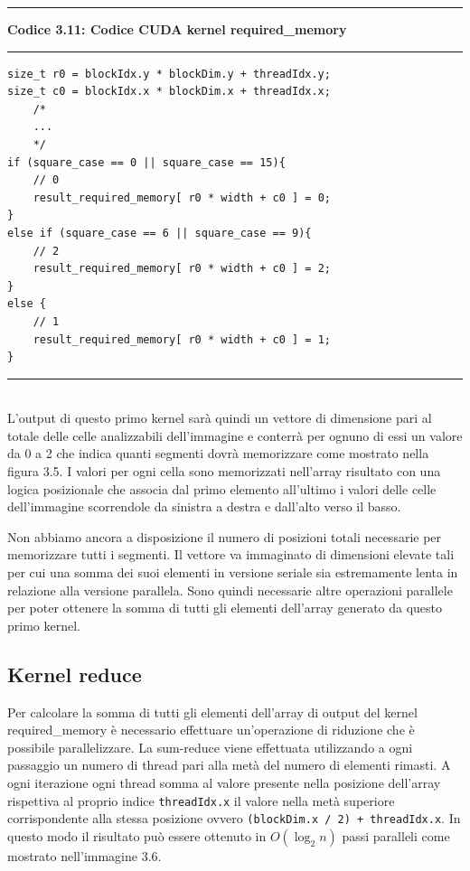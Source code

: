 \documentclass[12pt,a4paper]{report}
\begin{document}
\noindent\rule[0.5ex]{\linewidth}{2pt}
\small{\textbf{Codice 3.11: Codice CUDA kernel required\_memory}} \\
\noindent\rule[0.5ex]{\linewidth}{1pt}
\begin{lstlisting}
size_t r0 = blockIdx.y * blockDim.y + threadIdx.y;
size_t c0 = blockIdx.x * blockDim.x + threadIdx.x;
    /*
    ...
    */
if (square_case == 0 || square_case == 15){
    // 0
    result_required_memory[ r0 * width + c0 ] = 0;
}
else if (square_case == 6 || square_case == 9){
    // 2
    result_required_memory[ r0 * width + c0 ] = 2;
}
else {
    // 1
    result_required_memory[ r0 * width + c0 ] = 1;
}  
\end{lstlisting}
\noindent\rule[0.5ex]{\linewidth}{1pt} \\[10pt]
\newpage
L'output di questo primo kernel sarà quindi un vettore di dimensione pari al totale delle celle analizzabili dell'immagine e conterrà per ognuno di essi un valore da 0 a 2 che indica quanti segmenti dovrà memorizzare come mostrato nella figura 3.5. I valori per ogni cella sono memorizzati nell'array risultato con una logica posizionale che associa dal primo elemento all'ultimo i valori delle celle dell'immagine scorrendole da sinistra a destra e dall'alto verso il basso.
\begin{figure}[H]
\centering
\begin{floatrow}[1]
\end{floatrow}
\end{figure} 
Non abbiamo ancora a disposizione il numero di posizioni totali necessarie per memorizzare tutti i segmenti. Il vettore va immaginato di dimensioni elevate tali per cui una somma dei suoi elementi in versione seriale sia estremamente lenta in relazione alla versione parallela. Sono quindi necessarie altre operazioni parallele per poter ottenere la somma di tutti gli elementi dell'array generato da questo primo kernel. \newpage

\subsection{Kernel reduce}
Per calcolare la somma di tutti gli elementi dell'array di output del kernel required\_memory è necessario effettuare un'operazione di riduzione che è possibile parallelizzare. \newline
La sum-reduce viene effettuata utilizzando a ogni passaggio un numero di thread pari alla metà del numero di elementi rimasti. A ogni iterazione ogni thread somma al valore presente nella posizione dell'array rispettiva al proprio indice \verb|threadIdx.x| il valore nella metà superiore corrispondente alla stessa posizione ovvero \verb|(blockDim.x / 2) + threadIdx.x|. \newline In questo modo il risultato può essere ottenuto in $O(\log_2 n)$ passi paralleli come mostrato nell'immagine 3.6.
\end{document}
